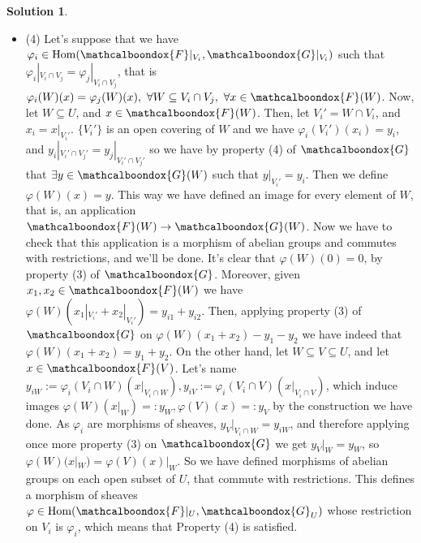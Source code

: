\documentclass[12pt]{article}
\theoremstyle{definition}
\newtheorem*{sol}{Solution}
\newcommand{\sF}{\ensuremath{\mathcalboondox{F}}}
\newcommand{\sG}{\ensuremath{\mathcalboondox{G}}}
\begin{document}
\begin{sol}
\begin{itemize}
		\item (4) Let's suppose that we have $\varphi_i \in \mathrm{Hom}(\sF|_{V_i}, \sG|_{V_i})$ such that $\varphi_i|_{V_i \cap V_j} = \varphi_j|_{V_i \cap V_j}$, that is $\varphi_i(W)(x) = \varphi_j(W)(x), \, \, \forall W \subseteq V_i \cap V_j, \, \, \forall x \in \sF(W)$. Now, let $W \subseteq U$, and $x \in \sF(W)$. Then, let $V_i' = W \cap V_i$, and $x_i = x|_{V_i'}$. $\{V_i'\}$ is an open covering of $W$ and we have $\varphi_i(V_i')(x_i) = y_i$, and $y_i|_{V_i'\cap V_j'} = y_j|_{V_i' \cap V_j'}$ so we have by property (4) of $\sG$ that $\exists y \in \sG(W)$ such that $y|_{V_i'} = y_i$. Then we define $\varphi(W)(x) = y$. This way we have defined an image for every element of $W$, that is, an application $\sF(W) \to \sG(W)$. Now we have to check that this application is a morphism of abelian groups and commutes with restrictions, and we'll be done. It's clear that $\varphi(W)(0) = 0$, by property (3) of $\sG$. Moreover, given $x_1, x_2 \in \sF(W)$ we have $\varphi(W)(x_1|_{V_i'} + x_2|_{V_i'}) = y_{i1} + y_{i2}$. Then, applying property (3) of $\sG$ on $\varphi(W)(x_1+x_2)-y_1-y_2$ we have indeed that $\varphi(W)(x_1+x_2) = y_1 + y_2$. On the other hand, let $W \subseteq V \subseteq U$, and let $x \in \sF(V)$. Let's name $y_{iW} := \varphi_i(V_i \cap W)(x|_{V_i \cap W}), y_{iV} := \varphi_i(V_i \cap V)(x|_{V_i \cap V})$, which induce images $\varphi(W)(x|_W) =: y_W, \varphi(V)(x) =: y_V$ by the construction we have done. As $\varphi_i$ are morphisms of sheaves, $y_V|_{V_i \cap W} = y_{iW}$, and therefore applying once more property (3) on $\sG$ we get $y_V|_{W} = y_W$, so $\varphi(W)(x|_W) = \varphi(V)(x)|_W$. So we have defined morphisms of abelian groups on each open subset of $U$, that commute with restrictions. This defines a morphism of sheaves $\varphi \in \mathrm{Hom}(\sF|_{U}, \sG_{U})$ whose restriction on $V_i$ is $\varphi_i$, which means that Property (4) is satisfied.
	\end{itemize}
\end{sol}
\end{document}

